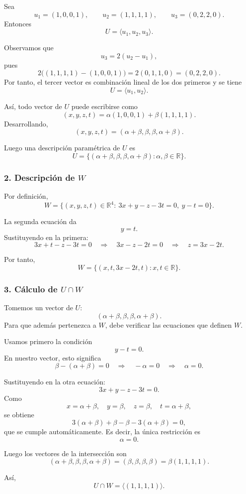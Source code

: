 \documentclass[12pt]{article}
\begin{document}
Sea
\[
u_1=(1,0,0,1),\qquad
u_2=(1,1,1,1),\qquad
u_3=(0,2,2,0).
\]
Entonces
\[
U=\langle u_1,u_2,u_3\rangle.
\]

Observamos que
\[
u_3=2(u_2-u_1),
\]
pues
\[
2\bigl((1,1,1,1)-(1,0,0,1)\bigr)=2(0,1,1,0)=(0,2,2,0).
\]
Por tanto, el tercer vector es combinación lineal de los dos primeros y se tiene
\[
U=\langle u_1,u_2\rangle.
\]

Así, todo vector de \(U\) puede escribirse como
\[
(x,y,z,t)=\alpha(1,0,0,1)+\beta(1,1,1,1).
\]
Desarrollando,
\[
(x,y,z,t)=(\alpha+\beta,\beta,\beta,\alpha+\beta).
\]

Luego una descripción paramétrica de \(U\) es
\[
U=\{(\alpha+\beta,\beta,\beta,\alpha+\beta):\alpha,\beta\in\mathbb{R}\}.
\]

\subsubsection*{2. Descripción de \(W\)}

Por definición,
\[
W=\{(x,y,z,t)\in\mathbb{R}^4:\ 3x+y-z-3t=0,\ y-t=0\}.
\]

La segunda ecuación da
\[
y=t.
\]
Sustituyendo en la primera:
\[
3x+t-z-3t=0
\quad\Longrightarrow\quad
3x-z-2t=0
\quad\Longrightarrow\quad
z=3x-2t.
\]

Por tanto,
\[
W=\{(x,t,3x-2t,t):x,t\in\mathbb{R}\}.
\]

\subsubsection*{3. Cálculo de \(U\cap W\)}

Tomemos un vector de \(U\):
\[
(\alpha+\beta,\beta,\beta,\alpha+\beta).
\]
Para que además pertenezca a \(W\), debe verificar las ecuaciones que definen \(W\).

Usamos primero la condición
\[
y-t=0.
\]
En nuestro vector, esto significa
\[
\beta-(\alpha+\beta)=0
\quad\Longrightarrow\quad
-\alpha=0
\quad\Longrightarrow\quad
\alpha=0.
\]

Sustituyendo en la otra ecuación:
\[
3x+y-z-3t=0.
\]
Como
\[
x=\alpha+\beta,\quad y=\beta,\quad z=\beta,\quad t=\alpha+\beta,
\]
se obtiene
\[
3(\alpha+\beta)+\beta-\beta-3(\alpha+\beta)=0,
\]
que se cumple automáticamente. Es decir, la única restricción es
\[
\alpha=0.
\]

Luego los vectores de la intersección son
\[
(\alpha+\beta,\beta,\beta,\alpha+\beta)=(\beta,\beta,\beta,\beta)=\beta(1,1,1,1).
\]

Así,
\[
U\cap W=\langle(1,1,1,1)\rangle.
\]
\end{document}
